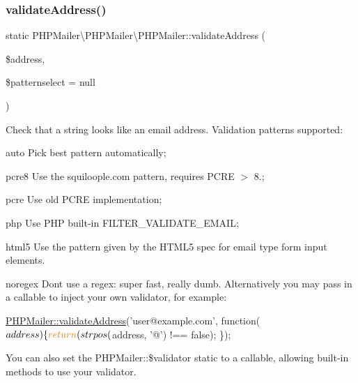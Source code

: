\subsubsection{\texorpdfstring{validate\+Address()}{validateAddress()}}
{\footnotesize\ttfamily static P\+H\+P\+Mailer\textbackslash{}\+P\+H\+P\+Mailer\textbackslash{}\+P\+H\+P\+Mailer\+::validate\+Address (\begin{DoxyParamCaption}\item[{}]{\$address,  }\item[{}]{\$patternselect = {\ttfamily null} }\end{DoxyParamCaption})\hspace{0.3cm}{\ttfamily [static]}}

Check that a string looks like an email address. Validation patterns supported\+:
\begin{DoxyItemize}
\item {\ttfamily auto} Pick best pattern automatically;
\item {\ttfamily pcre8} Use the squiloople.\+com pattern, requires P\+C\+RE $>$ 8.;
\item {\ttfamily pcre} Use old P\+C\+RE implementation;
\item {\ttfamily php} Use P\+HP built-\/in F\+I\+L\+T\+E\+R\+\_\+\+V\+A\+L\+I\+D\+A\+T\+E\+\_\+\+E\+M\+A\+IL;
\item {\ttfamily html5} Use the pattern given by the H\+T\+M\+L5 spec for \textquotesingle{}email\textquotesingle{} type form input elements.
\item {\ttfamily noregex} Don\textquotesingle{}t use a regex\+: super fast, really dumb. Alternatively you may pass in a callable to inject your own validator, for example\+:
\end{DoxyItemize}


\begin{DoxyCode}
\hyperlink{classPHPMailer_1_1PHPMailer_1_1PHPMailer_abc9724fcd40217503b3dcb5062791e3b}{PHPMailer::validateAddress}(\textcolor{stringliteral}{'user@example.com'}, \textcolor{keyword}{function}($address) \{
    \textcolor{keywordflow}{return} (strpos($address, \textcolor{charliteral}{'@'}) !== \textcolor{keyword}{false});
\});
\end{DoxyCode}


You can also set the P\+H\+P\+Mailer\+::\$validator static to a callable, allowing built-\/in methods to use your validator.


